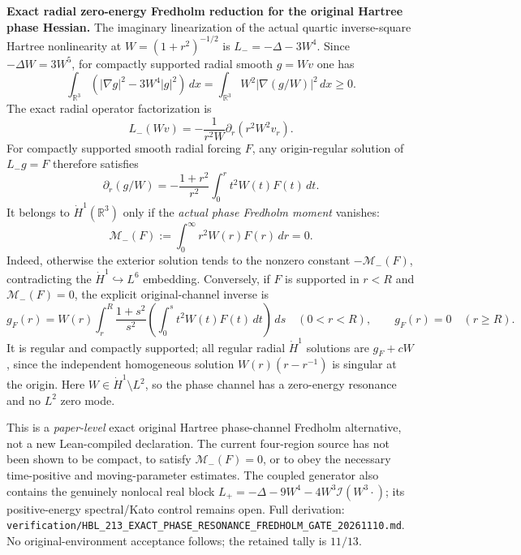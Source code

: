 \documentclass[11pt]{amsart}
\begin{document}
\medskip
\noindent\textbf{Exact radial zero-energy Fredholm reduction for the original Hartree phase Hessian.}
The imaginary linearization of the actual quartic inverse-square
Hartree nonlinearity at \(W=(1+r^2)^{-1/2}\) is
\(L_-=-\Delta-3W^4\).  Since \(-\Delta W=3W^5\),
for compactly supported radial smooth \(g=Wv\) one has
\[
 \int_{\mathbb R^3}(|\nabla g|^2-3W^4|g|^2)\,dx
 =\int_{\mathbb R^3}W^2|\nabla(g/W)|^2\,dx
 \ge0.
\]
The exact radial operator factorization is
\[
 L_-(Wv)
 =-\frac{1}{r^2W}\partial_r(r^2W^2v_r).
\]
For compactly supported smooth radial forcing \(F\), any origin-regular
solution of \(L_-g=F\) therefore satisfies
\[
 \partial_r(g/W)
 =-\frac{1+r^2}{r^2}\int_0^r t^2W(t)F(t)\,dt.
\]
It belongs to \(\dot H^1(\mathbb R^3)\) only if the
\emph{actual phase Fredholm moment} vanishes:
\[
 \mathcal M_-(F):=\int_0^\infty r^2W(r)F(r)\,dr=0.
\]
Indeed, otherwise the exterior solution tends to the nonzero constant
\(-\mathcal M_-(F)\), contradicting the \(\dot H^1\hookrightarrow L^6\)
embedding. Conversely, if \(F\) is supported in \(r<R\) and
\(\mathcal M_-(F)=0\), the explicit original-channel inverse is
\[
 g_F(r)=W(r)\int_r^R
       \frac{1+s^2}{s^2}
       \left(\int_0^s t^2W(t)F(t)\,dt\right)\,ds
 \quad(0<r<R),\qquad
 g_F(r)=0\quad(r\ge R).
\]
It is regular and compactly supported; all regular radial
\(\dot H^1\) solutions are \(g_F+cW\), since the independent
homogeneous solution \(W(r)(r-r^{-1})\) is singular at the origin.
Here \(W\in\dot H^1\setminus L^2\), so the phase channel has a
zero-energy resonance and no \(L^2\) zero mode.

This is a \emph{paper-level} exact original Hartree phase-channel
Fredholm alternative, not a new Lean-compiled declaration.
The current four-region source has not been shown to be compact,
to satisfy \(\mathcal M_-(F)=0\), or to obey the necessary
time-positive and moving-parameter estimates. The coupled generator
also contains the genuinely nonlocal real block
\(L_+=-\Delta-9W^4-4W^3\mathcal I(W^3\cdot)\);
its positive-energy spectral/Kato control remains open.
Full derivation:
\texttt{verification/HBL\_213\_EXACT\_PHASE\_RESONANCE\_FREDHOLM\_GATE\_20261110.md}.
No original-environment acceptance follows; the retained tally is
\(11/13\).
\end{document}
